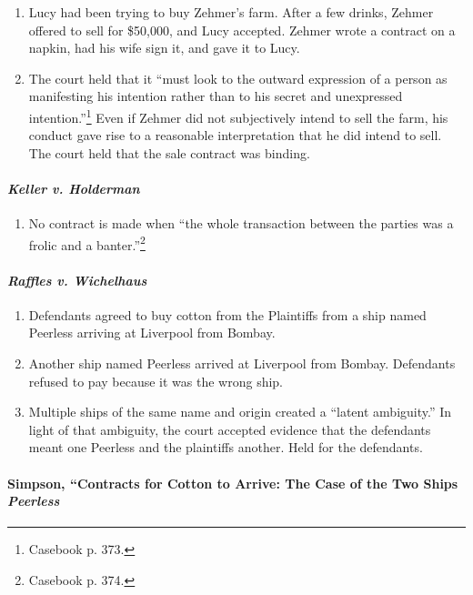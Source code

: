 \begin{enumerate}
    \item Lucy had been trying to buy Zehmer's farm. After a few drinks, 
    Zehmer offered to sell for \$50,000, and Lucy accepted. Zehmer wrote a 
    contract on a napkin, had his wife sign it, and gave it to Lucy.
    \item The court held that it ``must look to the outward expression of a 
    person as manifesting his intention rather than to his secret and 
    unexpressed intention.''\footnote{Casebook p. 373.} Even if Zehmer did not 
    subjectively intend to sell the farm, his conduct gave rise to a 
    reasonable interpretation that he did intend to sell. The court held that 
    the sale contract was binding.
\end{enumerate}

\paragraph{\emph{Keller v. Holderman}}

\begin{enumerate}
    \item No contract is made when ``the whole transaction between the parties 
    was a frolic and a banter.''\footnote{Casebook p. 374.}
\end{enumerate}

\paragraph{\emph{Raffles v. Wichelhaus}}

\begin{enumerate}
    \item Defendants agreed to buy cotton from the Plaintiffs from a ship 
    named Peerless arriving at Liverpool from Bombay.
    \item Another ship named Peerless arrived at Liverpool from Bombay. 
    Defendants refused to pay because it was the wrong ship.
    \item Multiple ships of the same name and origin created a ``latent 
    ambiguity.'' In light of that ambiguity, the court accepted evidence that 
    the defendants meant one Peerless and the plaintiffs another. Held for the 
    defendants.
\end{enumerate}

\paragraph{Simpson, ``Contracts for Cotton to Arrive: The Case of the Two 
Ships \emph{Peerless}}

